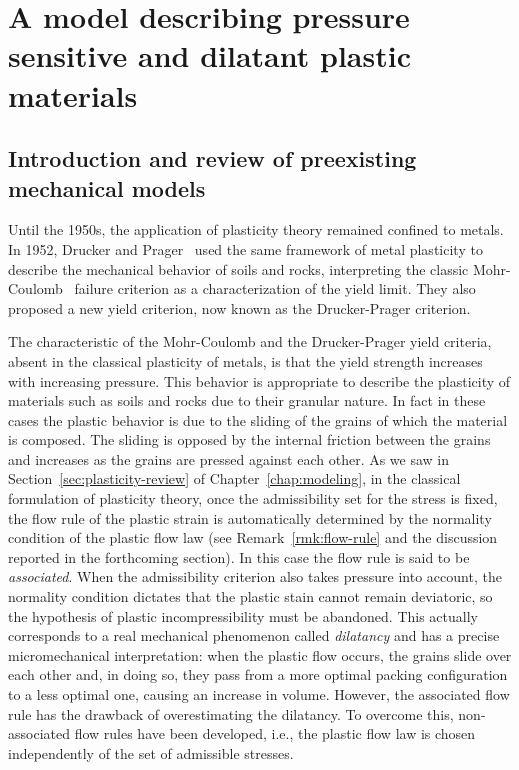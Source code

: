 \documentclass[a4paper,10pt,twoside]{amsbook}
\numberwithin{section}{chapter}
\numberwithin{equation}{chapter}
\theoremstyle{definition}
\begin{document}
\part{A model describing pressure sensitive and dilatant plastic materials}
\label{part:my-model}

\chapter{Introduction and review of preexisting mechanical models}
\label{chap:intro-pressure-sensitive}

Until the 1950s, the application of plasticity theory remained confined to metals. In 1952, Drucker and Prager~\cite{DruckerPrager1952} used the same framework of metal plasticity to describe the mechanical behavior of soils and rocks, interpreting the classic Mohr-Coulomb~\cite{Coulomb1776,Mohr1900} failure criterion as a characterization of the yield limit. They also proposed a new yield criterion, now known as the Drucker-Prager criterion.

The characteristic of the Mohr-Coulomb and the Drucker-Prager yield criteria, absent in the classical plasticity of metals, is that the yield strength increases with increasing pressure. This behavior is appropriate to describe the plasticity of materials such as soils and rocks due to their granular nature. In fact in these cases the plastic behavior is due to the sliding of the grains of which the material is composed. The sliding is opposed by the internal friction between the grains and increases as the grains are pressed against each other. As we saw in Section~\ref{sec:plasticity-review} of Chapter~\ref{chap:modeling}, in the classical formulation of plasticity theory, once the admissibility set for the stress is fixed, the flow rule of the plastic strain is automatically determined by the normality condition of the plastic flow law (see Remark~\ref{rmk:flow-rule} and the discussion reported in the forthcoming section). In this case the flow rule is said to be \emph{associated}. When the admissibility criterion also takes pressure into account, the normality condition dictates that the plastic stain cannot remain deviatoric, so the hypothesis of plastic incompressibility must be abandoned. This actually corresponds to a real mechanical phenomenon called \emph{dilatancy} and has a precise micromechanical interpretation: when the plastic flow occurs, the grains slide over each other and, in doing so, they pass from a more optimal packing configuration to a less optimal one, causing an increase in volume. However, the associated flow rule has the drawback of overestimating the dilatancy. To overcome this, non-associated flow rules have been developed, i.e., the plastic flow law is chosen independently of the set of admissible stresses.
\end{document}
